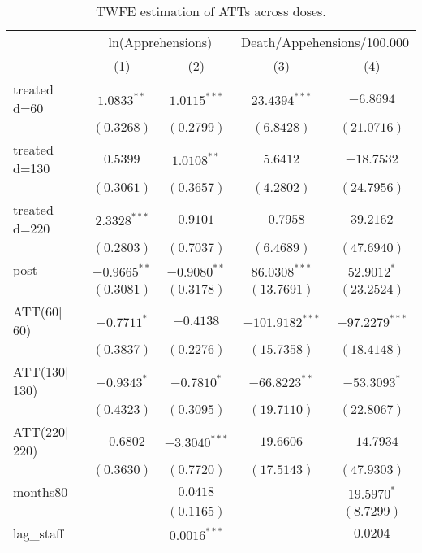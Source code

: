 
\begin{table}
\caption{TWFE estimation of ATTs across doses.}
\begin{center}
\begin{tabular}{l c c c c}
\hline
 & \multicolumn{2}{c}{ln(Apprehensions)} & \multicolumn{2}{c}{Death/Appehensions/100.000} \\
\cline{2-3} \cline{4-5}
 & (1) & (2) & (3) & (4) \\
\hline
treated d=60   & $1.0833^{**}$   & $1.0115^{***}$  & $23.4394^{***}$   & $-6.8694$        \\
               & $(0.3268)$      & $(0.2799)$      & $(6.8428)$        & $(21.0716)$      \\
treated d=130  & $0.5399$        & $1.0108^{**}$   & $5.6412$          & $-18.7532$       \\
               & $(0.3061)$      & $(0.3657)$      & $(4.2802)$        & $(24.7956)$      \\
treated d=220  & $2.3328^{***}$  & $0.9101$        & $-0.7958$         & $39.2162$        \\
               & $(0.2803)$      & $(0.7037)$      & $(6.4689)$        & $(47.6940)$      \\
post           & $-0.9665^{**}$  & $-0.9080^{**}$  & $86.0308^{***}$   & $52.9012^{*}$    \\
               & $(0.3081)$      & $(0.3178)$      & $(13.7691)$       & $(23.2524)$      \\
ATT(60$|$60)   & $-0.7711^{*}$   & $-0.4138$       & $-101.9182^{***}$ & $-97.2279^{***}$ \\
               & $(0.3837)$      & $(0.2276)$      & $(15.7358)$       & $(18.4148)$      \\
ATT(130$|$130) & $-0.9343^{*}$   & $-0.7810^{*}$   & $-66.8223^{**}$   & $-53.3093^{*}$   \\
               & $(0.4323)$      & $(0.3095)$      & $(19.7110)$       & $(22.8067)$      \\
ATT(220$|$220) & $-0.6802$       & $-3.3040^{***}$ & $19.6606$         & $-14.7934$       \\
               & $(0.3630)$      & $(0.7720)$      & $(17.5143)$       & $(47.9303)$      \\
months80       &                 & $0.0418$        &                   & $19.5970^{*}$    \\
               &                 & $(0.1165)$      &                   & $(8.7299)$       \\
lag\_staff     &                 & $0.0016^{***}$  &                   & $0.0204$         \\

\end{tabular}
\end{center}
\end{table}
